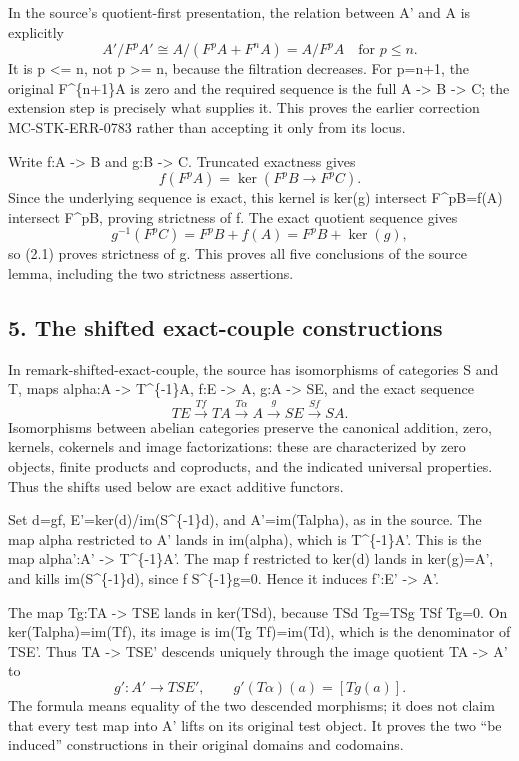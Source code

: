 \documentclass[11pt]{article}
\begin{document}
In the source's quotient-first presentation, the relation between A' and A is explicitly \[
A'/F^pA'
 \cong A/(F^pA+F^nA)=A/F^pA\quad\text{for }p\le n.        \tag{4.1}
\] It is p \textless= n, not p \textgreater= n, because the filtration decreases. For p=n+1, the original F\^{}\{n+1\}A is zero and the required sequence is the full A -\textgreater{} B -\textgreater{} C; the extension step is precisely what supplies it. This proves the earlier correction MC-STK-ERR-0783 rather than accepting it only from its locus.

Write f:A -\textgreater{} B and g:B -\textgreater{} C. Truncated exactness gives \[
f(F^pA)=\ker(F^pB\longrightarrow F^pC).
\] Since the underlying sequence is exact, this kernel is ker(g) intersect F\^{}pB=f(A) intersect F\^{}pB, proving strictness of f. The exact quotient sequence gives \[
g^{-1}(F^pC)=F^pB+f(A)=F^pB+\ker(g),
\] so (2.1) proves strictness of g. This proves all five conclusions of the source lemma, including the two strictness assertions.

\subsection{5. The shifted exact-couple constructions}\label{note-05-the-shifted-exact-couple-constructions}

In remark-shifted-exact-couple, the source has isomorphisms of categories S and T, maps alpha:A -\textgreater{} T\^{}\{-1\}A, f:E -\textgreater{} A, g:A -\textgreater{} SE, and the exact sequence \[
TE\xrightarrow{Tf}TA\xrightarrow{T\alpha}A
\xrightarrow{g}SE\xrightarrow{Sf}SA.
\] Isomorphisms between abelian categories preserve the canonical addition, zero, kernels, cokernels and image factorizations: these are characterized by zero objects, finite products and coproducts, and the indicated universal properties. Thus the shifts used below are exact additive functors.

Set d=gf, E'=ker(d)/im(S\^{}\{-1\}d), and A'=im(Talpha), as in the source. The map alpha restricted to A' lands in im(alpha), which is T\^{}\{-1\}A'. This is the map alpha':A' -\textgreater{} T\^{}\{-1\}A'. The map f restricted to ker(d) lands in ker(g)=A', and kills im(S\^{}\{-1\}d), since f S\^{}\{-1\}g=0. Hence it induces f':E' -\textgreater{} A'.

The map Tg:TA -\textgreater{} TSE lands in ker(TSd), because TSd Tg=TSg TSf Tg=0. On ker(Talpha)=im(Tf), its image is im(Tg Tf)=im(Td), which is the denominator of TSE'. Thus TA -\textgreater{} TSE' descends uniquely through the image quotient TA -\textgreater{} A' to \[
g':A'\longrightarrow TSE',\qquad
g'(T\alpha)(a)=[Tg(a)].                                  \tag{5.1}
\] The formula means equality of the two descended morphisms; it does not claim that every test map into A' lifts on its original test object. It proves the two ``be induced'' constructions in their original domains and codomains.
\end{document}
